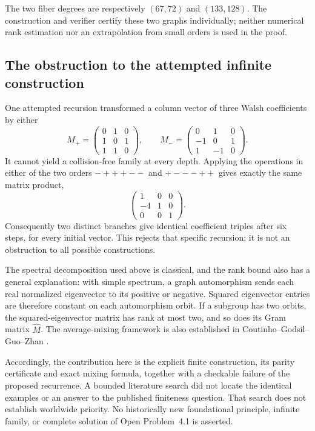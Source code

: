 \documentclass[11pt,a4paper]{article}
\theoremstyle{definition}
\theoremstyle{remark}
\begin{document}
The two fiber degrees are respectively $(67,72)$ and $(133,128)$.
The construction and verifier certify these two graphs individually;
neither numerical rank estimation nor an extrapolation from small
orders is used in the proof.

\subsection{The obstruction to the attempted infinite construction}

One attempted recursion transformed a column vector of three Walsh
coefficients by either
\[
 M_+=\begin{pmatrix}0&1&0\\1&0&1\\1&1&0\end{pmatrix},\qquad
 M_-=\begin{pmatrix}0&1&0\\-1&0&1\\1&-1&0\end{pmatrix}.
\]
It cannot yield a collision-free family at every depth. Applying the
operations in either of the two orders
$-+++--$ and $+---++$ gives exactly the same matrix product,
\[
 \begin{pmatrix}1&0&0\\-4&1&0\\0&0&1\end{pmatrix}.
\]
Consequently two distinct branches give identical coefficient triples
after six steps, for every initial vector. This rejects that specific
recursion; it is not an obstruction to all possible constructions.

The spectral decomposition used above is classical, and the rank bound
also has a general explanation: with simple spectrum, a graph
automorphism sends each real normalized eigenvector to its positive or
negative. Squared eigenvector entries are therefore constant on each
automorphism orbit. If a subgroup has two orbits, the squared-eigenvector
matrix has rank at most two, and so does its Gram matrix $\widehat M$.
The average-mixing framework is also established in
Coutinho--Godsil--Guo--Zhan \cite{t99cggz2018}.

Accordingly, the contribution here is the explicit finite construction,
its parity certificate and exact mixing formula, together with a
checkable failure of the proposed recurrence. A bounded literature
search did not locate the identical examples or an answer to the
published finiteness question. That search does not establish worldwide
priority. No historically new foundational principle, infinite family,
or complete solution of Open Problem~4.1 is asserted.
\end{document}
